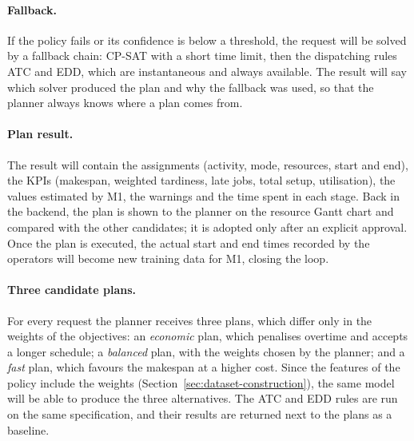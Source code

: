 \paragraph{Fallback.} If the policy fails or its confidence is below a threshold, the request
will be solved by a fallback chain: CP-SAT with a short time limit, then the dispatching rules ATC
and EDD, which are instantaneous and always available. The result will say which solver produced
the plan and why the fallback was used, so that the planner always knows where a plan comes
from.

\paragraph{Plan result.} The result will contain the assignments (activity, mode, resources, start
and end), the KPIs (makespan, weighted tardiness, late jobs, total setup, utilisation), the values
estimated by M1, the warnings and the time spent in each stage. Back in the backend, the plan is
shown to the planner on the resource Gantt chart and compared with the other candidates; it is
adopted only after an explicit approval. Once the plan is executed, the actual start and end
times recorded by the operators will become new training data for M1, closing the loop.

\paragraph{Three candidate plans.} For every request the planner receives three plans, which
differ only in the weights of the objectives: an \emph{economic} plan, which penalises overtime
and accepts a longer schedule; a \emph{balanced} plan, with the weights chosen by the planner;
and a \emph{fast} plan, which favours the makespan at a higher cost. Since the features of the policy
include the weights (Section~\ref{sec:dataset-construction}), the same model will be able to
produce the three alternatives. The ATC and EDD
rules are run on the same specification, and their results are returned next to the plans as a
baseline.

